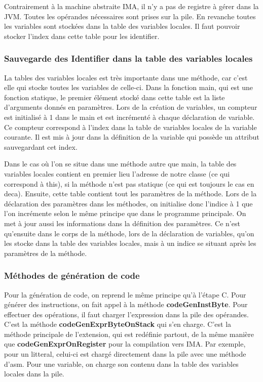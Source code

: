 \documentclass[12pt, a4paper, one side]{article}
\begin{document}
    Contrairement à la machine abstraite IMA, il n'y a pas de registre à gérer
    dans la JVM. Toutes les opérandes nécessaires sont prises sur la pile.
    En revanche toutes les variables sont stockées dans la table des variables
    locales. Il faut pouvoir stocker l'index dans cette table pour les identifier.

    \subsubsection{Sauvegarde des Identifier dans la table des variables locales}

    La tables des variables locales est très importante dans une méthode, car c'est
    elle qui stocke toutes les variables de celle-ci. Dans la fonction main, qui
    est une fonction statique, le premier élément stocké dans cette table est la
    liste d'arguments donnés en paramètres. Lors de la création de variables,
    un compteur est initialisé à 1 dans le main et est incrémenté à chaque
    déclaration de variable. Ce compteur correspond à l'index dans la table de variables locales de la variable courante. Il est mis à jour dans la définition
    de la variable qui possède un attribut sauvegardant cet index.

    Dans le cas où l'on se situe dans une méthode autre que main, la table des
    variables locales contient en premier lieu l'adresse de notre classe (ce qui
    correspond à this), si la méthode n'est pas statique (ce qui est toujours le
    cas en deca). Ensuite, cette table contient tout les paramètres de la méthode.
    Lors de la déclaration des paramètres dans les méthodes, on initialise donc
    l'indice à 1 que l'on incrémente selon le même principe que dans le programme
    principale. On met à jour aussi les informations dans la définition des
    paramètres. Ce n'est qu'ensuite dans le corps de la méthode, lors de la
    déclaration de variables, qu'on les stocke dans la table des variables locales,
    mais à un indice se situant après les paramètres de la méthode.

    \subsubsection{Méthodes de génération de code}

    Pour la génération de code, on reprend le même principe qu'à l'étape C. Pour générer des
    instructions, on fait appel à la méthode \textbf{codeGenInstByte}.
    Pour effectuer des opérations, il faut charger l'expression dans la pile
    des opérandes. C'est la méthode \textbf{codeGenExprByteOnStack} qui s'en
    charge. C'est la méthode principale de l'extension, qui est redéfinie partout,
    de la même manière que \textbf{codeGenExprOnRegister} pour la compilation
    vers IMA. Par exemple, pour un litteral, celui-ci est chargé directement
    dans la pile avec une méthode d'asm. Pour une variable, on charge son contenu
    dans la table des variables locales dans la pile.
\end{document}
